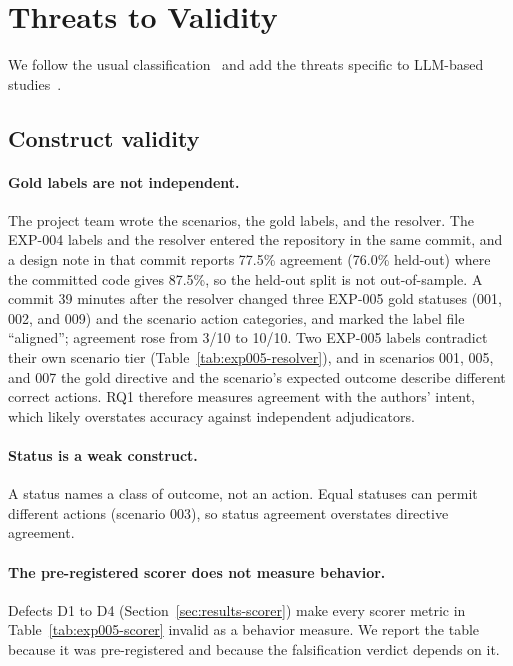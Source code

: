 \section{Threats to Validity}
\label{sec:threats}

We follow the usual classification~\cite{wohlin2012experimentation,runeson2009case} and add the threats specific to LLM-based studies~\cite{sallou2024breaking}.

\subsection{Construct validity}
\paragraph{Gold labels are not independent.} The project team wrote the scenarios, the gold labels, and the resolver. The EXP-004 labels and the resolver entered the repository in the same commit, and a design note in that commit reports 77.5\% agreement (76.0\% held-out) where the committed code gives 87.5\%, so the held-out split is not out-of-sample. A commit 39 minutes after the resolver changed three EXP-005 gold statuses (001, 002, and 009) and the scenario action categories, and marked the label file ``aligned''; agreement rose from 3/10 to 10/10. Two EXP-005 labels contradict their own scenario tier (Table~\ref{tab:exp005-resolver}), and in scenarios 001, 005, and 007 the gold directive and the scenario's expected outcome describe different correct actions. RQ1 therefore measures agreement with the authors' intent, which likely overstates accuracy against independent adjudicators.

\paragraph{Status is a weak construct.} A status names a class of outcome, not an action. Equal statuses can permit different actions (scenario 003), so status agreement overstates directive agreement.

\paragraph{The pre-registered scorer does not measure behavior.} Defects D1 to D4 (Section~\ref{sec:results-scorer}) make every scorer metric in Table~\ref{tab:exp005-scorer} invalid as a behavior measure. We report the table because it was pre-registered and because the falsification verdict depends on it.

